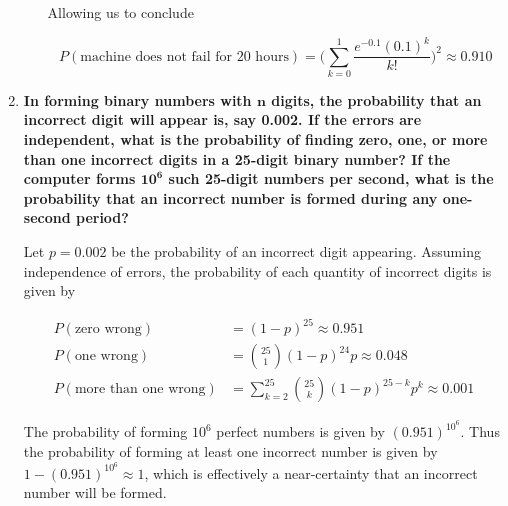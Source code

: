 \documentclass[10pt, oneside]{article}   	%
\theoremstyle{definition}
\begin{document}
\begin{enumerate}[label=8.\arabic*]
\begin{enumerate}
	Allowing us to conclude
	
	\[ P(\text{machine does not fail for 20 hours}) = \Bigg( \sum^1_{k=0} \frac{e^{-0.1} (0.1)^k}{k!} \Bigg)^2 \approx \boxed{0.910} \]
	
	\end{enumerate}

\item  \begin{tcolorbox}[
  colback=Cerulean!5!white,
  colframe=Cerulean!75!black]
\textbf{In forming binary numbers with $\bm{n}$ digits, the probability that an incorrect digit will appear is, say 0.002. If the errors are independent, what is the probability of finding zero, one, or more than one incorrect digits in a 25-digit binary number? If the computer forms $\bm{10^6}$ such 25-digit numbers per second, what is the probability that an incorrect number is formed during any one-second period?}
\end{tcolorbox}

Let $p = 0.002$ be the probability of an incorrect digit appearing. Assuming independence of errors, the probability of each quantity of incorrect digits is given by

\begin{align*}
P(\text{zero wrong}) &= (1-p)^{25} \approx \boxed{0.951} \\
P(\text{one wrong}) &= \binom{25}{1} (1-p)^{24} p \approx \boxed{0.048} \\
P(\text{more than one wrong}) &= \sum^{25}_{k=2} \binom{25}{k} (1-p)^{25-k} p^k \approx \boxed{0.001}
\end{align*}

The probability of forming $10^6$ perfect numbers is given by $(0.951)^{10^6}$. Thus the probability of forming at least one incorrect number is given by $\boxed{1 - (0.951)^{10^6} \approx 1}$, which is effectively a near-certainty that an incorrect number will be formed.


\end{enumerate}
\end{document}
